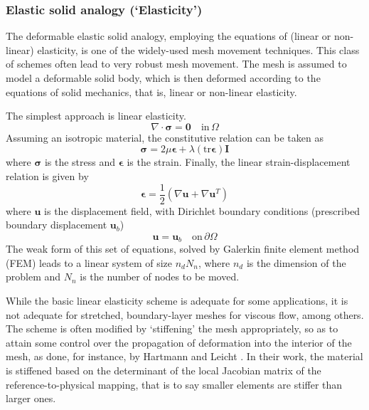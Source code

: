 \documentclass[letterpaper,11pt]{article}
\let\bld\boldsymbol
\begin{document}
\subsubsection{Elastic solid analogy (`Elasticity')}

The deformable elastic solid analogy, employing the equations of (linear or non-linear) elasticity, is one of the widely-used mesh movement techniques. This class of schemes often lead to very robust mesh movement. The mesh is assumed to model a deformable solid body, which is then deformed according to the equations of solid mechanics, that is, linear or non-linear elasticity.

The simplest approach is linear elasticity.
\begin{equation}
\nabla \cdot \bld{\sigma}  = \mathbf{0} \quad \text{in} \, \Omega
\end{equation}
Assuming an isotropic material, the constitutive relation can be taken as
\begin{equation}
\bld{\sigma} = 2\mu\bld{\epsilon} + \lambda (\mathrm{tr}\boldsymbol{\epsilon}) \bld{I}
\label{linelast:constt}
\end{equation}
where $\bld{\sigma}$ is the stress and $\bld{\epsilon}$ is the strain.
Finally, the linear strain-displacement relation is given by
\begin{equation}
\bld{\epsilon} = \frac12 (\nabla\bld{u}+\nabla\bld{u}^T)
\label{linelast:strain}
\end{equation}
where $\bld{u}$ is the displacement field, with Dirichlet boundary conditions (prescribed boundary displacement $\bld{u}_b$)
\begin{equation}
\bld{u} = \bld{u}_b \quad \text{on} \, \partial\Omega
\end{equation}
The weak form of this set of equations, solved by Galerkin finite element method (FEM) leads to a linear system of size $n_d N_n$, where $n_d$ is the dimension of the problem and $N_n$ is the number of nodes to be moved.

While the basic linear elasticity scheme is adequate for some applications, it is not adequate for stretched, boundary-layer meshes for viscous flow, among others. The scheme is often modified by `stiffening' the mesh appropriately, so as to attain some control over the propagation of deformation into the interior of the mesh, as done, for instance, by Hartmann and Leicht \cite{curve:hartmann}. In their work, the material is stiffened based on the determinant of the local Jacobian matrix of the reference-to-physical mapping, that is to say smaller elements are stiffer than larger ones.
\end{document}
